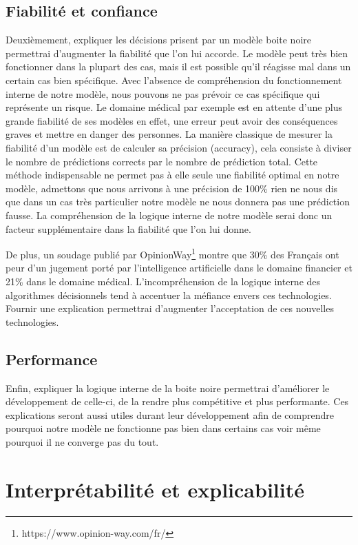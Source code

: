 \subsection{Fiabilité et confiance}
Deuxièmement, expliquer les décisions prisent par un modèle boite noire permettrai d'augmenter la fiabilité que l'on lui accorde. Le modèle peut très bien fonctionner dans la plupart des cas, mais il est possible qu'il réagisse mal dans un certain cas bien spécifique. Avec l'absence de compréhension du fonctionnement interne de notre modèle, nous pouvons ne pas prévoir ce cas spécifique qui représente un risque. Le domaine médical par exemple est en attente d'une plus grande fiabilité de ses modèles en effet, une erreur peut avoir des conséquences graves et mettre en danger des personnes. La manière classique de mesurer la fiabilité d'un modèle est de calculer sa précision (accuracy), cela consiste à diviser le nombre de prédictions corrects par le nombre de prédiction total. Cette méthode indispensable ne permet pas à elle seule une fiabilité optimal en notre modèle, admettons que nous arrivons à une précision de 100\% rien ne nous dis que dans un cas très particulier notre modèle ne nous donnera pas une prédiction fausse. La compréhension de la logique interne de notre modèle serai donc un facteur supplémentaire dans la fiabilité que l'on lui donne. \par
De plus, un soudage publié par OpinionWay\footnote{https://www.opinion-way.com/fr/} montre que 30\% des Français ont peur d'un jugement porté par l'intelligence artificielle dans le domaine financier et 21\% dans le domaine médical. L'incompréhension de la logique interne des algorithmes décisionnels tend à accentuer la méfiance envers ces technologies. Fournir une explication permettrai d'augmenter l'acceptation de ces nouvelles technologies.

\subsection{Performance}
Enfin, expliquer la logique interne de la boite noire permettrai d'améliorer le développement de celle-ci, de la rendre plus compétitive et plus performante. Ces explications seront aussi utiles durant leur développement afin de comprendre pourquoi notre modèle ne fonctionne pas bien dans certains cas voir même pourquoi il ne converge pas du tout.

\section{Interprétabilité et explicabilité}

